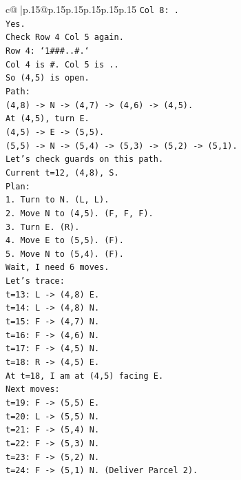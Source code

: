 \documentclass{article}
\begin{document}
{\begin{supertabular}{c@{$\;$}|p{.15\linewidth}@{}p{.15\linewidth}p{.15\linewidth}p{.15\linewidth}p{.15\linewidth}p{.15\linewidth}}
{{{\texttt{Col 8: .} \\
\texttt{Yes.} \\
\texttt{Check Row 4 Col 5 again.} \\
\texttt{Row 4: `1\#\#\#..\#.`} \\
\texttt{Col 4 is \#. Col 5 is ..} \\
\texttt{So (4,5) is open.} \\
\texttt{Path:} \\
\texttt{(4,8) {-}> N {-}> (4,7) {-}> (4,6) {-}> (4,5).} \\
\texttt{At (4,5), turn E.} \\
\texttt{(4,5) {-}> E {-}> (5,5).} \\
\texttt{(5,5) {-}> N {-}> (5,4) {-}> (5,3) {-}> (5,2) {-}> (5,1).} \\
\texttt{Let's check guards on this path.} \\
\texttt{Current t=12, (4,8), S.} \\
\texttt{Plan:} \\
\texttt{1. Turn to N. (L, L).} \\
\texttt{2. Move N to (4,5). (F, F, F).} \\
\texttt{3. Turn E. (R).} \\
\texttt{4. Move E to (5,5). (F).} \\
\texttt{5. Move N to (5,4). (F).} \\
\texttt{Wait, I need 6 moves.} \\
\texttt{Let's trace:} \\
\texttt{t=13: L {-}> (4,8) E.} \\
\texttt{t=14: L {-}> (4,8) N.} \\
\texttt{t=15: F {-}> (4,7) N.} \\
\texttt{t=16: F {-}> (4,6) N.} \\
\texttt{t=17: F {-}> (4,5) N.} \\
\texttt{t=18: R {-}> (4,5) E.} \\
\texttt{At t=18, I am at (4,5) facing E.} \\
\texttt{Next moves:} \\
\texttt{t=19: F {-}> (5,5) E.} \\
\texttt{t=20: L {-}> (5,5) N.} \\
\texttt{t=21: F {-}> (5,4) N.} \\
\texttt{t=22: F {-}> (5,3) N.} \\
\texttt{t=23: F {-}> (5,2) N.} \\
\texttt{t=24: F {-}> (5,1) N. (Deliver Parcel 2).} \\
}}}
\end{supertabular}}
\end{document}
